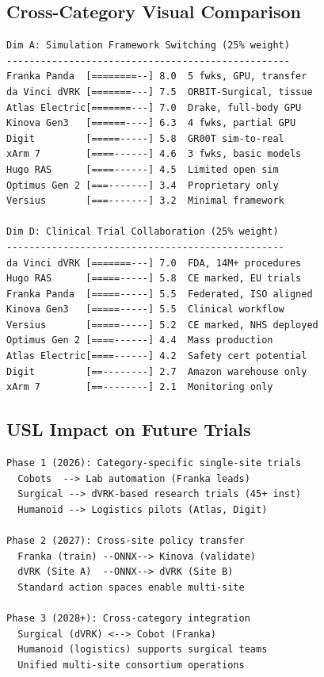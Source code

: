 \documentclass[11pt,a4paper]{article}
\begin{document}
\subsection{Cross-Category Visual Comparison}
\begin{lstlisting}[language={},basicstyle=\ttfamily\scriptsize,numbers=none,caption={Dimension A and D scores across all nine robots}]
Dim A: Simulation Framework Switching (25% weight)
--------------------------------------------------
Franka Panda  [========--] 8.0  5 fwks, GPU, transfer
da Vinci dVRK [=======---] 7.5  ORBIT-Surgical, tissue
Atlas Electric[=======---] 7.0  Drake, full-body GPU
Kinova Gen3   [======----] 6.3  4 fwks, partial GPU
Digit         [=====-----] 5.8  GR00T sim-to-real
xArm 7        [====------] 4.6  3 fwks, basic models
Hugo RAS      [====------] 4.5  Limited open sim
Optimus Gen 2 [===-------] 3.4  Proprietary only
Versius       [===-------] 3.2  Minimal framework

Dim D: Clinical Trial Collaboration (25% weight)
-------------------------------------------------
da Vinci dVRK [=======---] 7.0  FDA, 14M+ procedures
Hugo RAS      [=====-----] 5.8  CE marked, EU trials
Franka Panda  [=====-----] 5.5  Federated, ISO aligned
Kinova Gen3   [=====-----] 5.5  Clinical workflow
Versius       [=====-----] 5.2  CE marked, NHS deployed
Optimus Gen 2 [====------] 4.4  Mass production
Atlas Electric[====------] 4.2  Safety cert potential
Digit         [==--------] 2.7  Amazon warehouse only
xArm 7        [==--------] 2.1  Monitoring only
\end{lstlisting}

\subsection{USL Impact on Future Trials}
\begin{lstlisting}[language={},basicstyle=\ttfamily\scriptsize,numbers=none,caption={Phased timeline for physical AI oncology trials}]
Phase 1 (2026): Category-specific single-site trials
  Cobots  --> Lab automation (Franka leads)
  Surgical --> dVRK-based research trials (45+ inst)
  Humanoid --> Logistics pilots (Atlas, Digit)

Phase 2 (2027): Cross-site policy transfer
  Franka (train) --ONNX--> Kinova (validate)
  dVRK (Site A)  --ONNX--> dVRK (Site B)
  Standard action spaces enable multi-site

Phase 3 (2028+): Cross-category integration
  Surgical (dVRK) <--> Cobot (Franka)
  Humanoid (logistics) supports surgical teams
  Unified multi-site consortium operations
\end{lstlisting}
\end{document}
